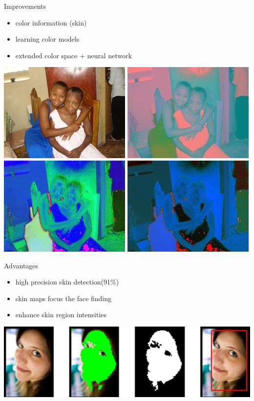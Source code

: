 \begin{xpsectionbox}{}{}
\begin{minipage}{0.5\linewidth}
\end{minipage}
\begin{minipage}{0.5\linewidth}
Improvements

\begin{itemize}
	  \item color information (skin) 
	  \item learning color models
	  \item extended color space + neural network
\end{itemize}
\begin{center}
			\includegraphics[height=0.16\linewidth]{images/Lena_RGB}
			\includegraphics[height=0.16\linewidth]{images/Lena_LAB}
			\includegraphics[height=0.16\linewidth]{images/Lena_HSV}
			\includegraphics[height=0.16\linewidth]{images/Lena_LUV}
\end{center}

Advantages

\begin{itemize}
	  \item high precision skin detection(91\%)  
	  \item skin maps focus the face finding
	  \item enhance skin region intensities
\end{itemize}
\begin{center}
			
			\includegraphics[height=0.2\linewidth]{images/skin_color_demo}
\end{center}
\end{minipage}
\end{xpsectionbox}

